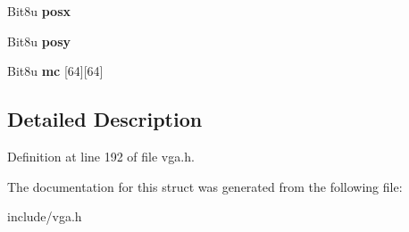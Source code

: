 \begin{DoxyCompactItemize}
\item 
\hypertarget{structVGA__HWCURSOR_abf50682342447c46dd13676cd0596281}{Bit8u {\bfseries posx}}\label{structVGA__HWCURSOR_abf50682342447c46dd13676cd0596281}

\item 
\hypertarget{structVGA__HWCURSOR_a436c666c0e7ef856d7ca98a6e5f30bd0}{Bit8u {\bfseries posy}}\label{structVGA__HWCURSOR_a436c666c0e7ef856d7ca98a6e5f30bd0}

\item 
\hypertarget{structVGA__HWCURSOR_a8c67327cfdedc8e3cb9a1a1d4d1d0e20}{Bit8u {\bfseries mc} \mbox{[}64\mbox{]}\mbox{[}64\mbox{]}}\label{structVGA__HWCURSOR_a8c67327cfdedc8e3cb9a1a1d4d1d0e20}

\end{DoxyCompactItemize}


\subsection{Detailed Description}


Definition at line 192 of file vga.\-h.



The documentation for this struct was generated from the following file\-:\begin{DoxyCompactItemize}
\item 
include/vga.\-h\end{DoxyCompactItemize}
